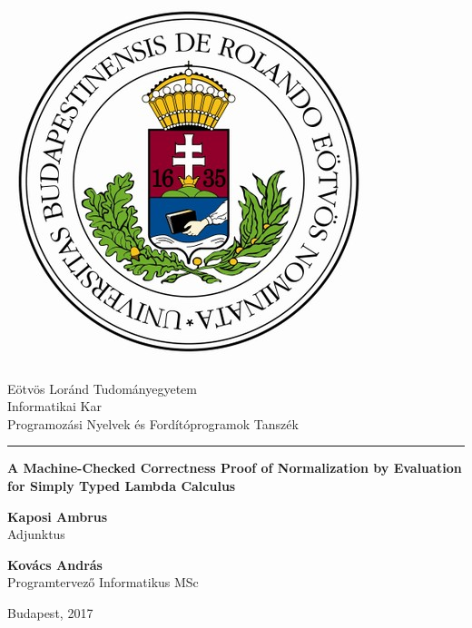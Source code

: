 \begin{titlepage}
\begin{minipage}{0.40\linewidth}
\includegraphics[scale=0.3]{elte-cimer}
\end{minipage}
\begin{minipage}{0.50\linewidth}
\begin{center}
Eötvös Loránd Tudományegyetem \\
Informatikai Kar \\
Programozási Nyelvek és Fordítóprogramok Tanszék
\end{center}
\end{minipage}
\hrule
\vfill
\begin{center}
\Huge
\textbf{A Machine-Checked Correctness Proof of Normalization by Evaluation for Simply Typed Lambda Calculus}
\normalsize
\end{center}
\vfill
\begin{minipage}[t]{0.5\linewidth}
\begin{flushleft}
\textbf{Kaposi Ambrus} \\
Adjunktus
\end{flushleft}
\end{minipage}
\begin{minipage}[t]{0.5\linewidth}
\begin{flushright}
\textbf{Kovács András} \\
Programtervező Informatikus MSc
\end{flushright}
\end{minipage}
\vfill
\begin{center}
Budapest, 2017
\end{center}
\end{titlepage}
\cleardoublepage
{}
\setcounter{page}{1}
   
